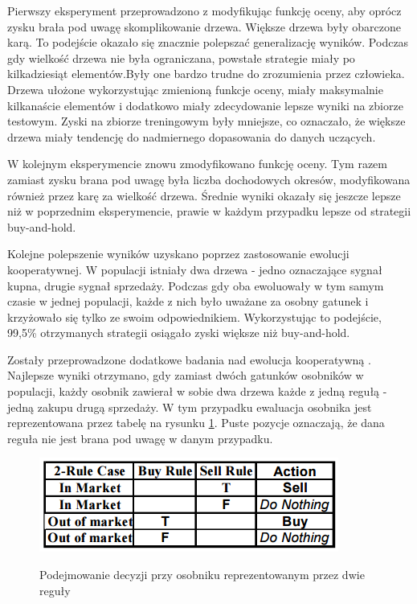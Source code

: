 \documentclass[twoside]{iisthesis}
\begin{document}
Pierwszy eksperyment przeprowadzono z modyfikując funkcję oceny, aby oprócz zysku brała pod uwagę skomplikowanie drzewa. Większe drzewa były obarczone karą. To podejście okazało się znacznie polepszać generalizację wyników. Podczas gdy wielkość drzewa nie była ograniczana, powstałe strategie miały po kilkadziesiąt elementów.Były one bardzo trudne do zrozumienia przez człowieka. Drzewa ułożone wykorzystując zmienioną funkcje oceny, miały maksymalnie kilkanaście elementów i dodatkowo miały zdecydowanie lepsze wyniki na zbiorze testowym. Zyski na zbiorze treningowym były mniejsze, co oznaczało, że większe drzewa miały tendencję do nadmiernego dopasowania do danych uczących. 

W kolejnym eksperymencie znowu zmodyfikowano funkcję oceny. Tym razem zamiast zysku brana pod uwagę była liczba dochodowych okresów, modyfikowana również przez karę za wielkość drzewa. Średnie wyniki okazały się jeszcze lepsze niż w poprzednim eksperymencie, prawie w każdym przypadku lepsze od strategii buy-and-hold.

Kolejne polepszenie wyników uzyskano poprzez zastosowanie ewolucji kooperatywnej. W populacji istniały dwa drzewa - jedno oznaczające sygnał kupna, drugie sygnał sprzedaży. Podczas gdy oba ewoluowały w tym samym czasie w jednej populacji, każde z nich było uważane za osobny gatunek i krzyżowało się tylko ze swoim odpowiednikiem. Wykorzystując to podejście, 99,5\% otrzymanych strategii osiągało zyski większe niż buy-and-hold.

Zostały przeprowadzone dodatkowe badania nad ewolucja kooperatywną \cite{Becker03cooperativecoevolution}. Najlepsze wyniki otrzymano, gdy zamiast dwóch gatunków osobników w populacji, każdy osobnik zawierał w sobie dwa drzewa każde z jedną regułą - jedną zakupu drugą sprzedaży. W tym przypadku ewaluacja osobnika jest reprezentowana przez tabelę na rysunku \ref{fig:koewolucja}. Puste pozycje oznaczają, że dana reguła nie jest brana pod uwagę w danym przypadku.

\begin{figure}[h]
\center
\caption {Podejmowanie decyzji przy osobniku reprezentowanym przez dwie reguły}
\includegraphics{koewolucja}
\label{fig:koewolucja}
\end{figure}
\end{document}

